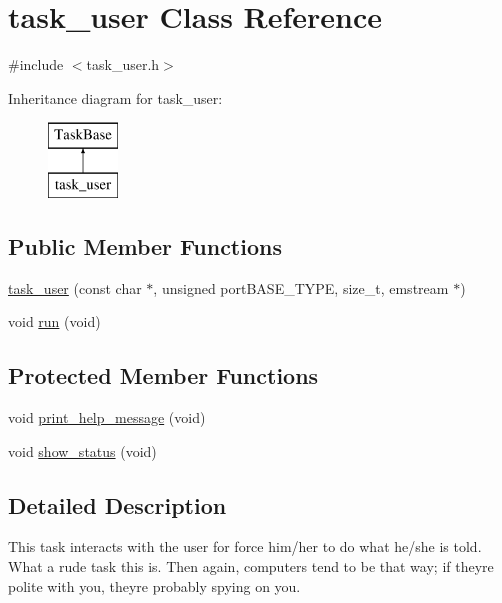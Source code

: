 \hypertarget{classtask__user}{}\section{task\+\_\+user Class Reference}
\label{classtask__user}


{\ttfamily \#include $<$task\+\_\+user.\+h$>$}

Inheritance diagram for task\+\_\+user\+:\begin{figure}[H]
\begin{center}
\leavevmode
\includegraphics[height=2.000000cm]{classtask__user}
\end{center}
\end{figure}
\subsection*{Public Member Functions}
\begin{DoxyCompactItemize}
\item 
\hyperlink{classtask__user_a3aba77563b375bb14838800608da48bc}{task\+\_\+user} (const char $\ast$, unsigned port\+B\+A\+S\+E\+\_\+\+T\+Y\+PE, size\+\_\+t, emstream $\ast$)
\item 
void \hyperlink{classtask__user_adca6429d57be25e8d411414fc8ad75af}{run} (void)
\end{DoxyCompactItemize}
\subsection*{Protected Member Functions}
\begin{DoxyCompactItemize}
\item 
void \hyperlink{classtask__user_a75475060f83bae1e44bcc8a5c34015c7}{print\+\_\+help\+\_\+message} (void)
\item 
void \hyperlink{classtask__user_a105bebbd9cb1031154c3dfc3662db4a0}{show\+\_\+status} (void)
\end{DoxyCompactItemize}


\subsection{Detailed Description}
This task interacts with the user for force him/her to do what he/she is told. What a rude task this is. Then again, computers tend to be that way; if they\textquotesingle{}re polite with you, they\textquotesingle{}re probably spying on you. 


